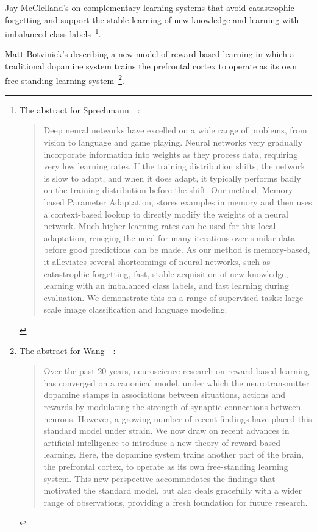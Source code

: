 Jay McClelland's {} on complementary learning systems that avoid catastrophic forgetting and support the stable learning of new knowledge and learning with imbalanced class labels~\cite{SprechmannetalICLR-18}\footnote{%
%
  The abstract for Sprechmann~\etal{}~\cite{SprechmannetalICLR-18}:
%
  \begin{quotation}
%
   Deep neural networks have excelled on a wide range of problems, from vision to language and game playing. Neural networks very gradually incorporate information into weights as they process data, requiring very low learning rates. If the training distribution shifts, the network is slow to adapt, and when it does adapt, it typically performs badly on the training distribution before the shift. Our method, Memory-based Parameter Adaptation, stores examples in memory and then uses a context-based lookup to directly modify the weights of a neural network. Much higher learning rates can be used for this local adaptation, reneging the need for many iterations over similar data before good predictions can be made. As our method is memory-based, it alleviates several shortcomings of neural networks, such as catastrophic forgetting, fast, stable acquisition of new knowledge, learning with an imbalanced class labels, and fast learning during evaluation. We demonstrate this on a range of supervised tasks: large-scale image classification and language modeling.
%
  \end{quotation}}.

Matt Botvinick's {} describing a new model of reward-based learning in which a traditional dopamine system trains the prefrontal cortex to operate as its own free-standing learning system~\cite{WangetalNATURE-NEUROSCIENCE-18}\footnote{%
%
  The abstract for Wang~\etal{}~\cite{WangetalNATURE-NEUROSCIENCE-18}:
%
  \begin{quotation}
%
   Over the past 20 years, neuroscience research on reward-based learning has converged on a canonical model, under which the neurotransmitter dopamine stamps in associations between situations, actions and rewards by modulating the strength of synaptic connections between neurons. However, a growing number of recent findings have placed this standard model under strain. We now draw on recent advances in artificial intelligence to introduce a new theory of reward-based learning. Here, the dopamine system trains another part of the brain, the prefrontal cortex, to operate as its own free-standing learning system. This new perspective accommodates the findings that motivated the standard model, but also deals gracefully with a wider range of observations, providing a fresh foundation for future research.
%
  \end{quotation}}.

